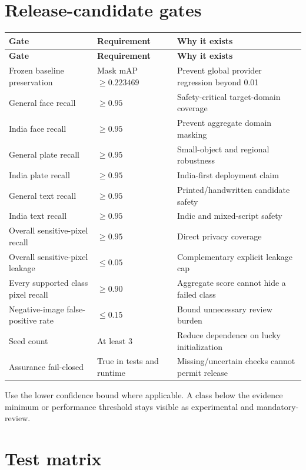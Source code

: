 \section{Release-candidate gates}

\begin{longtable}{@{}L{51mm}L{31mm}L{53mm}@{}}
\toprule
\textbf{Gate} & \textbf{Requirement} & \textbf{Why it exists} \\
\midrule
\endfirsthead
\toprule
\textbf{Gate} & \textbf{Requirement} & \textbf{Why it exists} \\
\midrule
\endhead
Frozen baseline preservation & Mask mAP $\geq 0.223469$ & Prevent global provider regression beyond 0.01 \\
General face recall & $\geq 0.95$ & Safety-critical target-domain coverage \\
India face recall & $\geq 0.95$ & Prevent aggregate domain masking \\
General plate recall & $\geq 0.95$ & Small-object and regional robustness \\
India plate recall & $\geq 0.95$ & India-first deployment claim \\
General text recall & $\geq 0.95$ & Printed/handwritten candidate safety \\
India text recall & $\geq 0.95$ & Indic and mixed-script safety \\
Overall sensitive-pixel recall & $\geq 0.95$ & Direct privacy coverage \\
Overall sensitive-pixel leakage & $\leq 0.05$ & Complementary explicit leakage cap \\
Every supported class pixel recall & $\geq 0.90$ & Aggregate score cannot hide a failed class \\
Negative-image false-positive rate & $\leq 0.15$ & Bound unnecessary review burden \\
Seed count & At least 3 & Reduce dependence on lucky initialization \\
Assurance fail-closed & True in tests and runtime & Missing/uncertain checks cannot permit release \\
\bottomrule
\end{longtable}

Use the lower confidence bound where applicable. A class below the evidence minimum or performance threshold stays visible as experimental and mandatory-review.

\section{Test matrix}

